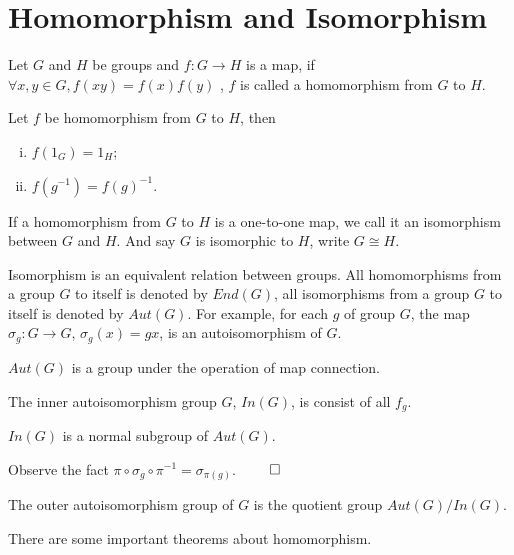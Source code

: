 \section{Homomorphism and Isomorphism}
\begin{defi}[homomorphism]
Let $G$ and $H$ be groups and $f : G \to H$ is a map, if $\forall x, y \in G, f(xy)=f(x)f(y)$ , $f$ is called a homomorphism from $G$ to $H$.
\end{defi}
\begin{pro}
Let $f$ be homomorphism from $G$ to $H$, then
\begin{enumerate}[i).]
\item $f(1_G)=1_H$;
\item $f(g^{-1})=f(g)^{-1}$.
\end{enumerate}
\end{pro}
\begin{defi}[isomorphism]
If a homomorphism from $G$ to $H$ is a one-to-one map, we call it an isomorphism between $G$ and $H$.
And say $G$ is isomorphic to $H$, write $G \cong H$.
\end{defi}
Isomorphism is an equivalent relation between groups.
All homomorphisms from a group $G$ to itself is denoted by $End(G)$,
all isomorphisms from a group $G$ to itself is denoted by $Aut(G)$.
For example, for each $g$ of group $G$, the map $\sigma_g : G \to G$, $\sigma_g(x) = gx$, is an autoisomorphism of $G$.
\begin{pro}
$Aut(G)$ is a group under the operation of map connection.
\end{pro}
\begin{defi}
The inner autoisomorphism group $G$, $In(G)$, is consist of all $f_g$.
\end{defi}
\begin{pro}
$In(G)$ is a normal subgroup of $Aut(G)$.
\end{pro}
\begin{prf}
Observe the fact $\pi \circ \sigma_g \circ \pi^{-1} = \sigma_{\pi(g)}$. $\qed$
\end{prf}
\begin{defi}
The outer autoisomorphism group of $G$ is the quotient group $Aut(G)/In(G)$.
\end{defi}
There are some important theorems about homomorphism.
